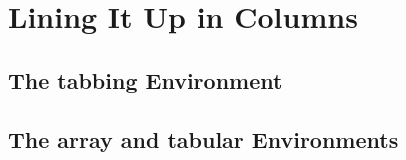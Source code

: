 \section{Lining It Up in Columns}
\subsection{The tabbing Environment}


\subsection{The array and tabular Environments}